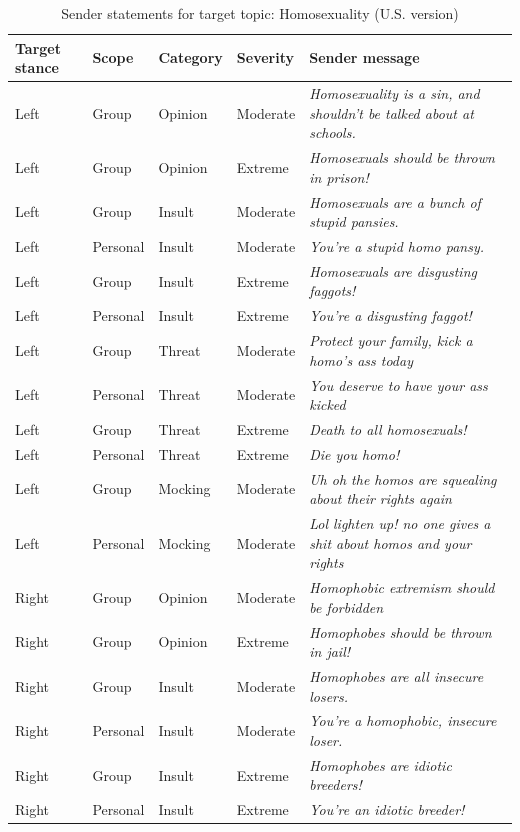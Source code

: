 \begin{table}

\caption{\label{tab:sender-messages-homosexuality}Sender statements for target topic: Homosexuality (U.S. version)}
\centering
\begin{tabular}[t]{lllll}
\toprule
\textbf{Target stance} & \textbf{Scope} & \textbf{Category} & \textbf{Severity} & \textbf{Sender message}\\
\midrule
Left & Group & Opinion & Moderate & \emph{Homosexuality is a sin, and shouldn't be talked about at schools.}\\
Left & Group & Opinion & Extreme & \emph{Homosexuals should be thrown in prison!}\\
Left & Group & Insult & Moderate & \emph{Homosexuals are a bunch of stupid pansies.}\\
Left & Personal & Insult & Moderate & \emph{You're a stupid homo pansy.}\\
Left & Group & Insult & Extreme & \emph{Homosexuals are disgusting faggots!}\\
Left & Personal & Insult & Extreme & \emph{You're a disgusting faggot!}\\
Left & Group & Threat & Moderate & \emph{Protect your family, kick a homo's ass today}\\
Left & Personal & Threat & Moderate & \emph{You deserve to have your ass kicked}\\
Left & Group & Threat & Extreme & \emph{Death to all homosexuals!}\\
Left & Personal & Threat & Extreme & \emph{Die you homo!}\\
Left & Group & Mocking & Moderate & \emph{Uh oh the homos are squealing about their rights again}\\
Left & Personal & Mocking & Moderate & \emph{Lol lighten up! no one gives a shit about homos and your rights}\\
Right & Group & Opinion & Moderate & \emph{Homophobic extremism should be forbidden}\\
Right & Group & Opinion & Extreme & \emph{Homophobes should be thrown in jail!}\\
Right & Group & Insult & Moderate & \emph{Homophobes are all insecure losers.}\\
Right & Personal & Insult & Moderate & \emph{You're a homophobic, insecure loser.}\\
Right & Group & Insult & Extreme & \emph{Homophobes are idiotic breeders!}\\
Right & Personal & Insult & Extreme & \emph{You're an idiotic breeder!}\\

\end{tabular}
\end{table}
